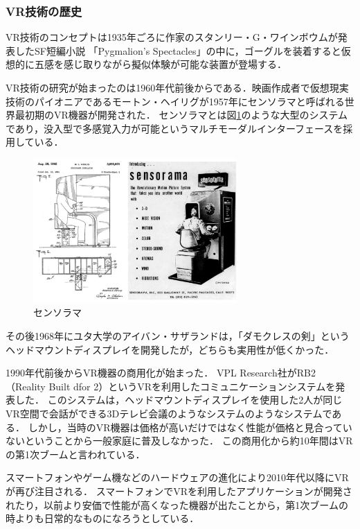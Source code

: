 \documentclass[12pt,a4j]{ltjsarticle}
\begin{document}
\subsubsection{VR技術の歴史}
VR技術のコンセプトは1935年ごろに作家のスタンリー・G・ワインボウムが発表したSF短編小説
「Pygmalion's Spectacles」の中に，ゴーグルを装着すると仮想的に五感を感じ取りながら擬似体験が可能な装置が登場する．

VR技術の研究が始まったのは1960年代前後からである．映画作成者で仮想現実技術のパイオニアであるモートン・ヘイリグが1957年にセンソラマと呼ばれる世界最初期のVR機器が開発された．
センソラマとは図\ref{fig:センソラマ.pdf}のような大型のシステムであり，没入型で多感覚入力が可能というマルチモーダルインターフェースを採用している．

\begin{figure}[h]
\begin{center}
 \includegraphics[clip,height=55mm]{センソラマ.pdf}
\end{center}
 \caption{センソラマ}
 \label{fig:センソラマ.pdf}
\end{figure}

その後1968年にユタ大学のアイバン・サザランドは，「ダモクレスの剣」というヘッドマウントディスプレイを開発したが，どちらも実用性が低くかった\cite{VRの概念の登場}．

1990年代前後からVR機器の商用化が始まった．
VPL Research社がRB2（Reality Built dfor 2）というVRを利用したコミュニケーションシステムを発表した．
このシステムは，ヘッドマウントディスプレイを使用した2人が同じVR空間で会話ができる3Dテレビ会議のようなシステムのようなシステムである．
しかし，当時のVR機器は価格が高いだけではなく性能が価格と見合っていないということから一般家庭に普及しなかった．
この商用化から約10年間はVRの第1次ブームと言われている\cite{VRの初の商用化}．

スマートフォンやゲーム機などのハードウェアの進化により2010年代以降にVRが再び注目される\cite{VRの概念の登場}．
スマートフォンでVRを利用したアプリケーションが開発されたり，以前より安価で性能が高くなった機器が出たことから，第1次ブームの時よりも日常的なものになろうとしている．
\end{document}
